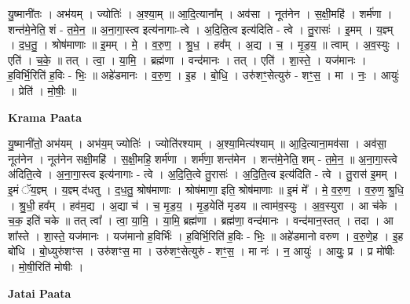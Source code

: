 \documentclass[17pt]{extarticle}
\begin{document}
यु॒ष्मानी॑तः । अभ॑यम् । ज्योतिः॑ । अ॒श्या॒म् ॥ आ॒दि॒त्याना᳚म् । अव॑सा । नूत॑नेन । स॒क्षी॒महि॑ । शर्म॑णा । शन्त॑मे॒नेति॒ शं - त॒मे॒न॒ ॥ अ॒ना॒गा॒स्त्व इत्य॑नागाः-त्वे । अ॒दि॒ति॒त्व इत्य॑दिति - त्वे । तु॒रासः॑ । इ॒मम् । य॒ज्ञ्म् । द॒ध॒तु॒ । श्रोष॑माणाः ॥ इ॒मम् । मे॒ । व॒रु॒ण॒ । श्रु॒ध॒ । हव᳚म् । अ॒द्य । च॒ । मृ॒ड॒य॒ ॥ त्वाम् । अ॒व॒स्युः । एति॑ । च॒के॒ ॥ तत् । त्वा॒ । या॒मि॒ । ब्रह्म॑णा । वन्द॑मानः । तत् । एति॑ । शा॒स्ते॒ । यज॑मानः । ह॒विर्भि॒रिति॑ ह॒विः - भिः॒ ॥ अहे॑डमानः । व॒रु॒ण॒ । इ॒ह । बो॒धि॒ । उरु॑शꣳ॒॒सेत्युरु॑ - शꣳ॒॒स॒ । मा । नः॒ । आयुः॑ । प्रेति॑ । मो॒षीः॒ ॥  \newline


\textbf{Krama Paata} \newline

यु॒ष्मानी॑तो॒ अभ॑यम् । अभ॑य॒म् ज्योतिः॑ । ज्योति॑रश्याम् । अ॒श्या॒मित्य॑श्याम् ॥ आ॒दि॒त्याना॒मव॑सा । अव॑सा॒ नूत॑नेन । नूत॑नेन सक्षी॒महि॑ । स॒क्षी॒महि॒ शर्म॑णा । शर्म॑णा॒ शन्त॑मेन । शन्त॑मे॒नेति॒ शम् - त॒मे॒न॒ ॥ अ॒ना॒गा॒स्त्वे अ॑दिति॒त्वे । अ॒ना॒गा॒स्त्व इत्य॑नागाः - त्वे । अ॒दि॒ति॒त्वे तु॒रासः॑ । अ॒दि॒ति॒त्व इत्य॑दिति - त्वे । तु॒रास॑ इ॒मम् । इ॒मं ॅय॒ज्ञ्म् । य॒ज्ञ्म् द॑धतु । द॒ध॒तु॒ श्रोष॑माणाः । श्रोष॑माणा॒ इति॒ श्रोष॑माणाः ॥ इ॒मं मे᳚ । मे॒ व॒रु॒ण॒ । व॒रु॒ण॒ श्रु॒धि॒ । श्रु॒धी॒ हव᳚म् । हव॑म॒द्य । अ॒द्या च॑ । च॒ मृ॒ड॒य॒ । मृ॒ड॒येति॑ मृडय ॥ त्वाम॑व॒स्युः । अ॒व॒स्युरा । आ च॑के । च॒क॒ इति॑ चके ॥ तत् त्वा᳚ । त्वा॒ या॒मि॒ । या॒मि॒ ब्रह्म॑णा । ब्रह्म॑णा॒ वन्द॑मानः । वन्द॑मान॒स्तत् । तदा । आ शा᳚स्ते । शा॒स्ते॒ यज॑मानः । यज॑मानो ह॒विर्भिः॑ । ह॒विर्भि॒रिति॑ ह॒विः - भिः॒ ॥ अहे॑डमानो वरुण । व॒रु॒णे॒ह । इ॒ह बो॑धि । बो॒ध्युरु॑शꣳस । उरु॑शꣳस॒ मा । उरु॑शꣳ॒॒सेत्युरु॑ - शꣳ॒॒स॒ । मा नः॑ । न॒ आयुः॑ । आयुः॒ प्र । प्र मो॑षीः । मो॒षी॒रिति॑ मोषीः । \newline

\textbf{Jatai Paata} \newline
\end{document}
